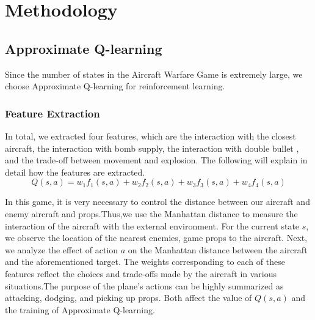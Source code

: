 \documentclass{article}
\begin{document}

    

\section{ Methodology}
    \subsection{Approximate Q-learning}
        Since the number of states in the Aircraft Warfare Game is extremely large, we choose Approximate Q-learning for reinforcement learning. 
    \subsubsection{Feature Extraction}
        In total, we extracted four features, which are the interaction with the closest aircraft, the interaction with bomb supply, the interaction with double bullet , and the trade-off between movement and explosion. The following will explain in detail how the features are extracted.
        \[Q(s,a) = w_1f_1(s,a)+w_2f_2(s,a)+w_3f_3(s,a)+w_4f_4(s,a)\]
    
        In this game, it is very necessary to control the distance between our aircraft and enemy aircraft and props.Thus,we use the Manhattan distance to measure the interaction of the aircraft with the external environment. For the current state $s$, we observe the location of the nearest enemies, game props to the aircraft. Next, we analyze the effect of action $a$ on the Manhattan distance between the aircraft and the aforementioned target. The weights corresponding to each of these features reflect the choices and trade-offs made by the aircraft in various situations.The purpose of the plane's actions can be highly summarized as attacking, dodging, and picking up props. Both affect the value of $Q(s,a)$ and the training of Approximate Q-learning.
\end{document}
